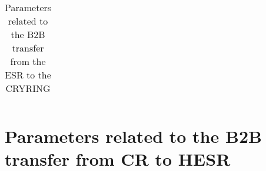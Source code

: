 \begin{longtable}{ | c | c | c | c | c | c |}
   \caption{Parameters related to the B2B transfer from the ESR to the CRYRING}
	\label{ESRtoCRYRING}
\end{longtable}
 
 

\newpage
\section{Parameters related to the B2B transfer from CR to HESR}
\label{sec:CRtoHESR}
 
